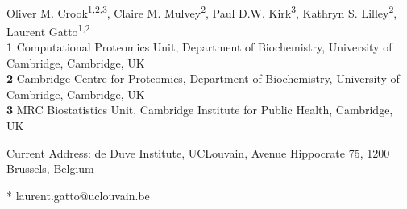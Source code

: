\documentclass[10pt,letterpaper]{article}\usepackage[]{graphicx}\usepackage[]{color}
\begin{document}
\vspace*{0.2in}

\begin{flushleft}
{\Large
\textbf{}
}
\newline
\\
Oliver M. Crook\textsuperscript{1,2,3},
Claire M. Mulvey\textsuperscript{2},
Paul D.W. Kirk\textsuperscript{3},
Kathryn S. Lilley\textsuperscript{2},
Laurent Gatto\textsuperscript{1,2\textcurrency *}
\\
\bigskip
\textbf{1} Computational Proteomics Unit, Department of  Biochemistry, University of Cambridge, Cambridge, UK
\\
\textbf{2} Cambridge Centre for Proteomics, Department of Biochemistry, University of Cambridge, Cambridge, UK
\\
\textbf{3} MRC Biostatistics Unit, Cambridge Institute for Public   Health, Cambridge, UK
\\
\bigskip


\textcurrency Current Address: de Duve Institute, UCLouvain, Avenue  Hippocrate 75, 1200 Brussels, Belgium

* laurent.gatto@uclouvain.be



\end{flushleft}
\end{document}
